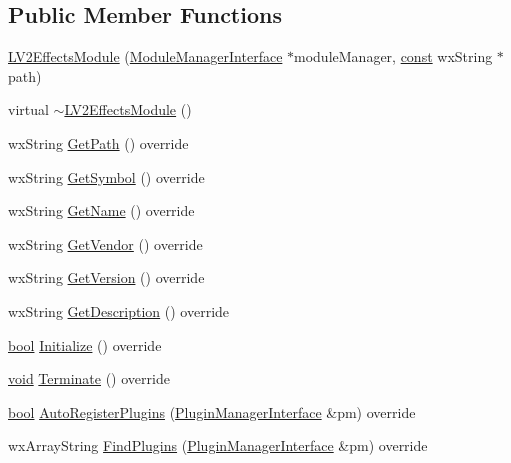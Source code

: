 \subsection*{Public Member Functions}
\begin{DoxyCompactItemize}
\item 
\hyperlink{class_l_v2_effects_module_a10c5630bb074be84d73fcf3e03e190d7}{L\+V2\+Effects\+Module} (\hyperlink{class_module_manager_interface}{Module\+Manager\+Interface} $\ast$module\+Manager, \hyperlink{getopt1_8c_a2c212835823e3c54a8ab6d95c652660e}{const} wx\+String $\ast$path)
\item 
virtual \hyperlink{class_l_v2_effects_module_adfe67229206aa43e9678ad1333fd3bf6}{$\sim$\+L\+V2\+Effects\+Module} ()
\item 
wx\+String \hyperlink{class_l_v2_effects_module_a082597f66c0daadc98551d222aafd59f}{Get\+Path} () override
\item 
wx\+String \hyperlink{class_l_v2_effects_module_a3f50b3870868c65dc32787db5d8feb2d}{Get\+Symbol} () override
\item 
wx\+String \hyperlink{class_l_v2_effects_module_a3baac174889150aa763eb2550af879c3}{Get\+Name} () override
\item 
wx\+String \hyperlink{class_l_v2_effects_module_a34cc03c5b2ae086cb5bfef88643e04a6}{Get\+Vendor} () override
\item 
wx\+String \hyperlink{class_l_v2_effects_module_a602815e15fbf034ec760336ced31e302}{Get\+Version} () override
\item 
wx\+String \hyperlink{class_l_v2_effects_module_aa5f0bd3eba417fe85fd9e45f031af4e1}{Get\+Description} () override
\item 
\hyperlink{mac_2config_2i386_2lib-src_2libsoxr_2soxr-config_8h_abb452686968e48b67397da5f97445f5b}{bool} \hyperlink{class_l_v2_effects_module_a862b5b56e7f9db4ee9cda8a1685786bb}{Initialize} () override
\item 
\hyperlink{sound_8c_ae35f5844602719cf66324f4de2a658b3}{void} \hyperlink{class_l_v2_effects_module_a43cdaeeb8c554279d4e5380f59aecdd1}{Terminate} () override
\item 
\hyperlink{mac_2config_2i386_2lib-src_2libsoxr_2soxr-config_8h_abb452686968e48b67397da5f97445f5b}{bool} \hyperlink{class_l_v2_effects_module_a040183b32cfa39ad3c7523910a58e2ae}{Auto\+Register\+Plugins} (\hyperlink{class_plugin_manager_interface}{Plugin\+Manager\+Interface} \&pm) override
\item 
wx\+Array\+String \hyperlink{class_l_v2_effects_module_ab9c3a062ece451de6155db4efd877a1c}{Find\+Plugins} (\hyperlink{class_plugin_manager_interface}{Plugin\+Manager\+Interface} \&pm) override

\end{DoxyCompactItemize}
